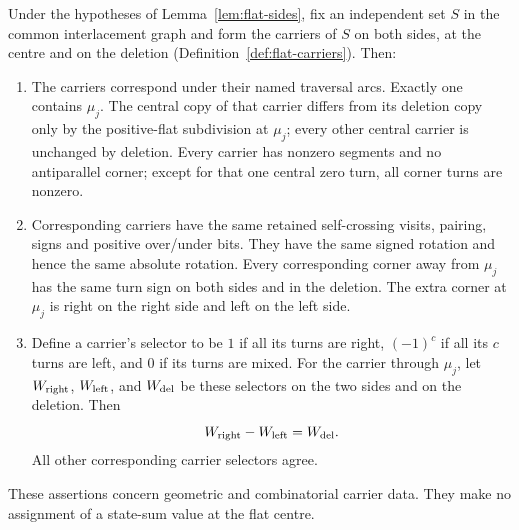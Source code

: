 \begin{corollary}\label{cor:flat-carriers}\leanok
Under the hypotheses of Lemma~\ref{lem:flat-sides}, fix an independent
set $S$ in the common interlacement graph and form the carriers of $S$ on
both sides, at the centre and on the deletion
(Definition~\ref{def:flat-carriers}). Then:
\begin{enumerate}
\item[(i)] The carriers correspond under their named traversal arcs.
Exactly one contains $\mu_j$. The central copy of that carrier differs
from its deletion copy only by the positive-flat subdivision at $\mu_j$;
every other central carrier is unchanged by deletion. Every carrier
has nonzero segments and no antiparallel corner; except for that one
central zero turn, all corner turns are nonzero.
\item[(ii)] Corresponding carriers have the same retained self-crossing
visits, pairing, signs and positive over/under bits. They have the same
signed rotation and hence the same absolute rotation. Every corresponding
corner away from $\mu_j$ has the same turn sign on both sides and in
the deletion. The extra corner at $\mu_j$ is right on the right side
and left on the left side.
\item[(iii)] Define a carrier's selector to be $1$ if all its turns are
right, $(-1)^c$ if all its $c$ turns are left, and $0$ if its turns are
mixed. For the carrier through $\mu_j$, let $W_{\rm right}$,
$W_{\rm left}$, and $W_{\rm del}$ be these selectors on the two sides
and on the deletion. Then
\begin{equation}\label{flatpr:selector-identity}
W_{\rm right}-W_{\rm left}=W_{\rm del}.
\end{equation}
All other corresponding carrier selectors agree.
\end{enumerate}
These assertions concern geometric and combinatorial carrier data.
They make no assignment of a state-sum value at the flat centre.

\end{corollary}
